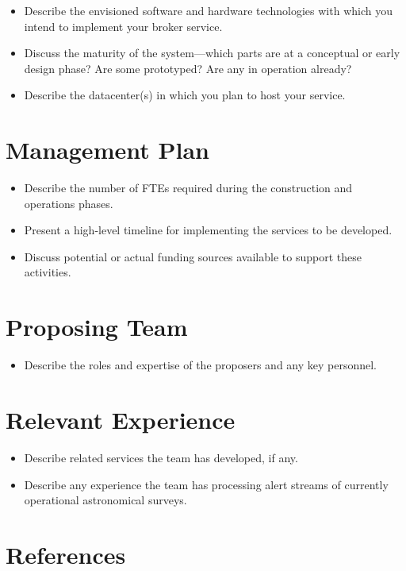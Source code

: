 \documentclass[11pt, letterpaper]{article}
\begin{document}
\begin{itemize}
\item Describe the envisioned software and hardware technologies with which you intend to implement your broker service.
\item Discuss the maturity of the system---which parts are at a conceptual or early design phase?  Are some prototyped? Are any in operation already?
\item Describe the datacenter(s) in which you plan to host your service.
\end{itemize}

	
\section{Management Plan}

\begin{itemize}
\item Describe the number of FTEs required during the construction and operations phases.
\item Present a high-level timeline for implementing the services to be developed.
\item Discuss potential or actual funding sources available to support these activities.	
\end{itemize}


\section{Proposing Team}

\begin{itemize}
\item Describe the roles and expertise of the proposers and any key personnel.
\end{itemize}

\section{Relevant Experience}

\begin{itemize}
\item Describe related services the team has developed, if any.
\item Describe any experience the team has processing alert streams of currently operational astronomical surveys. 
\end{itemize}

\section{References}
\end{document}

